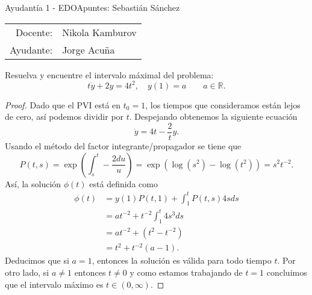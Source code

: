 \documentclass[../pheader.tex]{subfiles}
\begin{document}
{\sc Ayudantía 1 - EDO\hfill \small\rm Apuntes: Sebastián Sánchez}

\begin{center}
    \begin{tabular}{rl}
        Docente:& Nikola Kamburov\\
        Ayudante:& Jorge Acuña
    \end{tabular}
\end{center}

\begin{problema}
Resuelva y encuentre el intervalo máximal del problema:
\[
    t\dot{y} + 2y = 4t^2
    ,\quad
    y(1) = a
    \qquad a\in \mathbb{R}.
\]
\end{problema}
\begin{proof}
Dado que el PVI está en \(t_0 = 1\), los tiempos que consideramos están lejos de
cero, así podemos dividir por \(t\). Despejando obtenemos la siguiente
ecuación
\[
    \dot{y} = 4t - \frac{2}{t} y.
\]
Usando el método del factor integrante/propagador se tiene que
\[
    P(t,s)
    =
    \exp\left(\int_{s}^{t} -\frac{2 du}{u}\right)
    =
    \exp\left(\log(s^2) - \log(t^2)\right)
    =
    s^{2} t^{-2}
.\]
Así, la solución \(\phi(t)\) está definida como
\begin{align*}
    \phi(t)
    &= y(1) P(t,1) + \int_{1}^{t} P(t,s) 4s ds
    \\&= a t^{-2} + t^{-2} \int_{1}^{t} 4 s^3 ds
    \\&= a t^{-2} + (t^{2} - t^{-2})
    \\&= t^{2} + t^{-2} (a - 1).
\end{align*}
Deducimos que si \(a = 1\), entonces la solución es válida para todo tiempo
\(t\). Por otro lado, si \(a \ne 1\) entonces \(t\ne 0\) y como estamos
trabajando de \(t = 1\) concluimos que el intervalo máximo es
\(t\in (0, \infty)\).
\end{proof}
\end{document}
